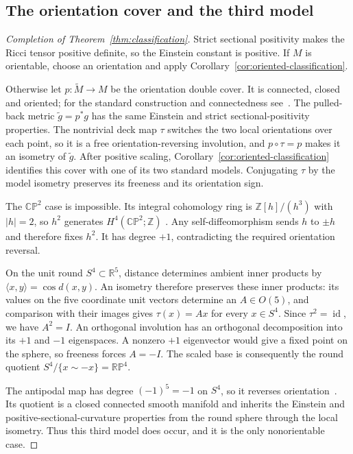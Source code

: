 \subsection{The orientation cover and the third model}

\begin{proof}[Completion of Theorem~\ref{thm:classification}]
Strict sectional positivity makes the Ricci tensor positive definite,
so the Einstein constant is positive.
If $M$ is orientable, choose an orientation and apply
Corollary~\ref{cor:oriented-classification}.

Otherwise let $p:\widetilde M\to M$ be the orientation double cover.
It is connected, closed and oriented; for the standard construction and
connectedness see~\cite[Proposition~3.25]{Hatcher2002}.
The pulled-back metric $\widetilde g=p^*g$ has the same Einstein and
strict sectional-positivity properties. The nontrivial deck map
$\tau$ switches the two local orientations over each point, so it is
a free orientation-reversing involution, and $p\circ\tau=p$ makes it
an isometry of $\widetilde g$. After positive scaling,
Corollary~\ref{cor:oriented-classification} identifies this cover with one of its
two standard models. Conjugating $\tau$ by the model isometry preserves
its freeness and its orientation sign.

The $\mathbb{CP}^2$ case is impossible. Its integral cohomology ring is
$\mathbb Z[h]/(h^3)$ with $|h|=2$, so $h^2$ generates
$H^4(\mathbb{CP}^2;\mathbb Z)$
\cite[Theorem~3.19]{Hatcher2002}. Any self-diffeomorphism sends $h$ to
$\pm h$ and therefore fixes $h^2$. It has degree $+1$, contradicting
the required orientation reversal.

On the unit round $S^4\subset\mathbb R^5$, distance determines ambient
inner products by $\langle x,y\rangle=\cos d(x,y)$. An isometry therefore
preserves these inner products: its values on the five coordinate unit
vectors determine an $A\in O(5)$, and comparison with their images gives
$\tau(x)=Ax$ for every $x\in S^4$. Since $\tau^2=\operatorname{id}$,
we have $A^2=I$. An orthogonal involution has an orthogonal decomposition
into its $+1$ and $-1$ eigenspaces. A nonzero $+1$ eigenvector would give
a fixed point on the sphere, so freeness forces $A=-I$. The scaled base
is consequently the round quotient
$S^4/\{x\sim -x\}=\mathbb{RP}^4$.

The antipodal map has degree $(-1)^5=-1$ on $S^4$, so it reverses
orientation~\cite[Section~2.2, property~(f)]{Hatcher2002}.
Its quotient is a closed connected smooth manifold
and inherits the Einstein and positive-sectional-curvature properties
from the round sphere through the local isometry. Thus this third model
does occur, and it is the only nonorientable case.
\end{proof}
